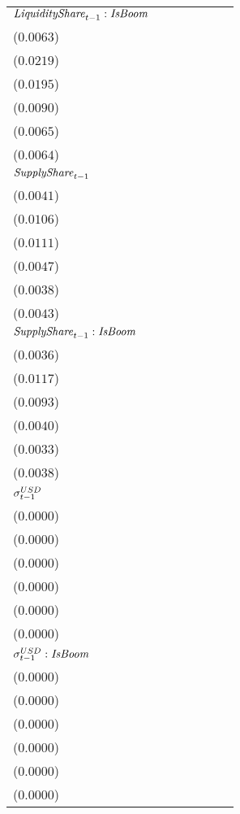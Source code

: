 \begin{tabular}{lllllll}
${\it LiquidityShare}_{t-1}:{\it IsBoom}$ & \makecell{$-0.0148^{**}$ \\ ($0.0063$)} & \makecell{$-0.0063^{}$ \\ ($0.0219$)} & \makecell{$0.0289^{}$ \\ ($0.0195$)} & \makecell{$0.0218^{**}$ \\ ($0.0090$)} & \makecell{$0.0120^{*}$ \\ ($0.0065$)} & \makecell{$-0.0075^{}$ \\ ($0.0064$)} \\
${\it SupplyShare}_{t-1}$ & \makecell{$0.0176^{***}$ \\ ($0.0041$)} & \makecell{$0.0328^{***}$ \\ ($0.0106$)} & \makecell{$0.0468^{***}$ \\ ($0.0111$)} & \makecell{$0.0093^{**}$ \\ ($0.0047$)} & \makecell{$0.0043^{}$ \\ ($0.0038$)} & \makecell{$0.0215^{***}$ \\ ($0.0043$)} \\
${\it SupplyShare}_{t-1}:{\it IsBoom}$ & \makecell{$-0.0019^{}$ \\ ($0.0036$)} & \makecell{$0.0171^{}$ \\ ($0.0117$)} & \makecell{$-0.0265^{***}$ \\ ($0.0093$)} & \makecell{$-0.0040^{}$ \\ ($0.0040$)} & \makecell{$-0.0014^{}$ \\ ($0.0033$)} & \makecell{$-0.0050^{}$ \\ ($0.0038$)} \\
${\it \sigma}^{USD}_{t-1}$ & \makecell{$-0.0000^{}$ \\ ($0.0000$)} & \makecell{$-0.0000^{}$ \\ ($0.0000$)} & \makecell{$0.0000^{}$ \\ ($0.0000$)} & \makecell{$0.0000^{}$ \\ ($0.0000$)} & \makecell{$0.0000^{**}$ \\ ($0.0000$)} & \makecell{$-0.0000^{}$ \\ ($0.0000$)} \\
${\it \sigma}^{USD}_{t-1}:{\it IsBoom}$ & \makecell{$0.0000^{***}$ \\ ($0.0000$)} & \makecell{$0.0001^{***}$ \\ ($0.0000$)} & \makecell{$-0.0000^{***}$ \\ ($0.0000$)} & \makecell{$-0.0000^{***}$ \\ ($0.0000$)} & \makecell{$-0.0000^{***}$ \\ ($0.0000$)} & \makecell{$0.0000^{***}$ \\ ($0.0000$)} \\

\end{tabular}
